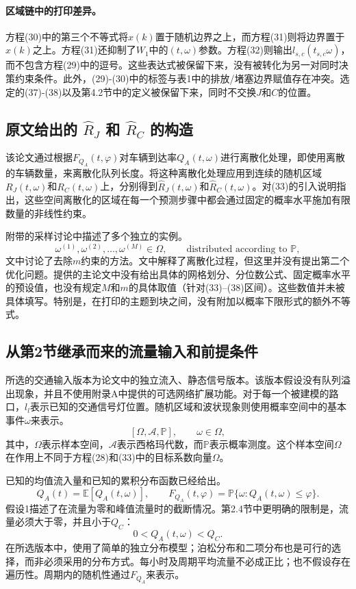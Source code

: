 \documentclass{article}
\begin{document}
\paragraph{区域链中的打印差异。}
方程(30)中的第三个不等式将\(x(k)\)置于随机边界之上，而方程(31)则将边界置于\(x(k)\)之上。方程(31)还抑制了\(W_1\)中的\((t,\omega)\)参数。方程(32)则输出\(l_{s,c}(t_{s,c}\omega)\)，而不包含方程(29)中的逗号。这些表达式被保留下来，没有被转化为另一对同时决策约束条件。此外，(29)-(30)中的标签与表1中的排放/堵塞边界赋值存在冲突。选定的(37)-(38)以及第4.2节中的定义被保留下来，同时不交换\(J\)和\(C\)的位置。

\subsection*{原文给出的 \(\hat R_J\) 和 \(\hat R_C\) 的构造}
该论文通过根据\(F_{Q_A}(t,\varphi)\)对车辆到达率\(Q_A(t,\omega)\)进行离散化处理，即使用离散的车辆数量，来离散化队列长度。将这种离散化处理应用到连续的随机区域\(R_J(t,\omega)\)和\(R_C(t,\omega)\)上，分别得到\(\hat R_J(t,\omega)\)和\(\hat R_C(t,\omega)\)。对(33)的引入说明指出，这些空间离散化的区域在每一个预测步骤中都会通过固定的概率水平施加有限数量的非线性约束。

附带的采样讨论中描述了多个独立的实例。
\[
\omega^{(1)},\omega^{(2)},\ldots,\omega^{(M)}\in\Omega,
\qquad\text{distributed according to }\mathbb P,
\]
文中讨论了去除\(m\)约束的方法。文中解释了离散化过程，但这里并没有提出第二个优化问题。提供的主论文中没有给出具体的网格划分、分位数公式、固定概率水平的预设值，也没有规定\(M\)和\(m\)的具体取值（针对(33)--(38)区间）。这些数值并未被具体填写。特别是，在打印的主题到块之间，没有附加以概率下限形式的额外不等式。

\subsection*{从第2节继承而来的流量输入和前提条件}
所选的交通输入版本为论文中的独立流入、静态信号版本。该版本假设没有队列溢出现象，并且不使用附录A中提供的可选网络扩展功能。对于每一个被建模的路口，\(l_l\)表示已知的交通信号灯位置。随机区域和波状现象则使用概率空间中的基本事件\(\omega\)来表示。
\[
[\Omega,\mathcal A,\mathbb P],\qquad \omega\in\Omega,
\]
其中，\(\Omega\)表示样本空间，\(\mathcal A\)表示西格玛代数，而\(\mathbb P\)表示概率测度。这个样本空间\(\Omega\)在作用上不同于方程(28)和(33)中的目标系数向量\(\Omega\)。

已知的均值流入量和已知的累积分布函数已经给出。
\[
Q_A(t)=\mathbb E[Q_A(t,\omega)],\qquad
F_{Q_A}(t,\varphi)=\mathbb P\{\omega:Q_A(t,\omega)\leq\varphi\}.
\]
假设1描述了在流量为零和峰值流量时的截断情况。第2.4节中更明确的限制是，流量必须大于零，并且小于\(Q_C\)：
\[
0<Q_A(t,\omega)<Q_C.
\]
在所选版本中，使用了简单的独立分布模型；泊松分布和二项分布也是可行的选择，而非必须采用的分布方式。每小时及周期平均流量不必成正比；也不假设存在遍历性。周期内的随机性通过\(F_{Q_A}\)来表示。
\end{document}
